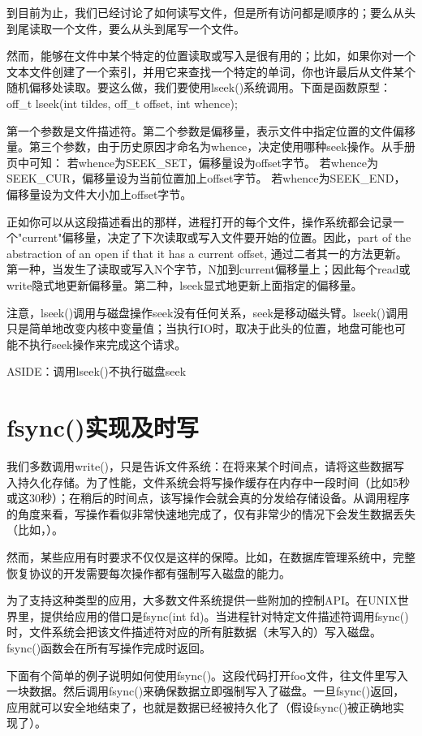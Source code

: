 到目前为止，我们已经讨论了如何读写文件，但是所有访问都是顺序的；要么从头到尾读取一个文件，要么从头到尾写一个文件。

然而，能够在文件中某个特定的位置读取或写入是很有用的；比如，如果你对一个文本文件创建了一个索引，并用它来查找一个特定的单词，你也许最后从文件某个随机偏移处读取。要这么做，我们要使用lseek()系统调用。下面是函数原型：\\
off\_t lseek(int tildes, off\_t offset, int whence);

第一个参数是文件描述符。第二个参数是偏移量，表示文件中指定位置的文件偏移量。第三个参数，由于历史原因才命名为whence，决定使用哪种seek操作。从手册页中可知：
若whence为SEEK\_SET，偏移量设为offset字节。
若whence为SEEK\_CUR，偏移量设为当前位置加上offset字节。
若whence为SEEK\_END，偏移量设为文件大小加上offset字节。

正如你可以从这段描述看出的那样，进程打开的每个文件，操作系统都会记录一个"current"偏移量，决定了下次读取或写入文件要开始的位置。因此，part of the abstraction of an open if that it has a current offset, 通过二者其一的方法更新。第一种，当发生了读取或写入N个字节，N加到current偏移量上；因此每个read或write隐式地更新偏移量。第二种，lseek显式地更新上面指定的偏移量。

注意，lseek()调用与磁盘操作seek没有任何关系，seek是移动磁头臂。lseek()调用只是简单地改变内核中变量值；当执行IO时，取决于此头的位置，地盘可能也可能不执行seek操作来完成这个请求。

ASIDE：调用lseek()不执行磁盘seek


\section{fsync()实现及时写}

我们多数调用write()，只是告诉文件系统：在将来某个时间点，请将这些数据写入持久化存储。为了性能，文件系统会将写操作缓存在内存中一段时间（比如5秒或这30秒）；在稍后的时间点，该写操作会就会真的分发给存储设备。从调用程序的角度来看，写操作看似非常快速地完成了，仅有非常少的情况下会发生数据丢失（比如，）。

然而，某些应用有时要求不仅仅是这样的保障。比如，在数据库管理系统中，完整恢复协议的开发需要每次操作都有强制写入磁盘的能力。

为了支持这种类型的应用，大多数文件系统提供一些附加的控制API。在UNIX世界里，提供给应用的借口是fsync(int fd)。当进程针对特定文件描述符调用fsync()时，文件系统会把该文件描述符对应的所有脏数据（未写入的）写入磁盘。fsync()函数会在所有写操作完成时返回。

下面有个简单的例子说明如何使用fsync()。这段代码打开foo文件，往文件里写入一块数据。然后调用fsync()来确保数据立即强制写入了磁盘。一旦fsync()返回，应用就可以安全地结束了，也就是数据已经被持久化了（假设fsync()被正确地实现了）。

